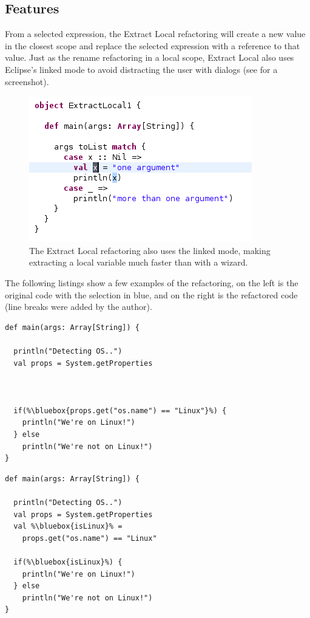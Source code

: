 \documentclass[10pt,a4paper,oneside]{scrreprt}
\begin{document}
\subsection{Features}

From a selected expression, the Extract Local refactoring will create a new value in the closest scope and replace the selected expression with a reference to that value. Just as the rename refactoring in a local scope, Extract Local also uses Eclipse's linked mode to avoid distracting the user with dialogs (see  for a screenshot).

\begin{figure}
  \centering
  \includegraphics[width=0.5\linewidth]{extract_local_screenshot_1.png}
  \caption{The Extract Local refactoring also uses the linked mode, making extracting a local variable much faster than with a wizard.}
  \label{figure:extract-local-screenshot-1}
\end{figure}


The following listings show a few examples of the refactoring, on the left is the original code with the selection in blue, and on the right is the refactored code (line breaks were added by the author).

\begin{multicols}{2}
\begin{lstlisting}
def main(args: Array[String]) {

  println("Detecting OS..")
  val props = System.getProperties
  


  if(%\bluebox{props.get("os.name") == "Linux"}%) {
    println("We're on Linux!")
  } else
    println("We're not on Linux!")
}
\end{lstlisting}
\begin{lstlisting}
def main(args: Array[String]) {

  println("Detecting OS..")
  val props = System.getProperties
  val %\bluebox{isLinux}% = 
    props.get("os.name") == "Linux"
  
  if(%\bluebox{isLinux}%) {
    println("We're on Linux!")
  } else
    println("We're not on Linux!")
}
\end{lstlisting}
\end{multicols}
\end{document}
